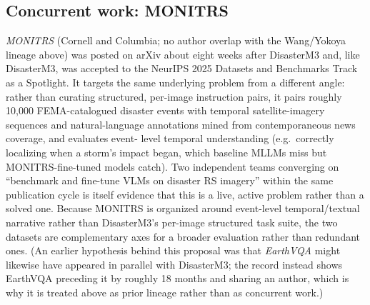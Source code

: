 \subsection{Concurrent work: MONITRS}
\label{sec:related-concurrent}

\emph{MONITRS}  (Cornell and Columbia; no author
overlap with the Wang/Yokoya lineage above) was posted on arXiv about eight
weeks after DisasterM3 and, like DisasterM3, was accepted to the NeurIPS 2025
Datasets and Benchmarks Track as a Spotlight. It targets the same
underlying problem from a different angle: rather than curating structured,
per-image instruction pairs, it pairs roughly 10,000 FEMA-catalogued disaster
events with temporal satellite-imagery sequences and natural-language
annotations mined from contemporaneous news coverage, and evaluates event-
level temporal understanding (e.g.\ correctly localizing when a storm's
impact began, which baseline MLLMs miss but MONITRS-fine-tuned models catch).
Two independent teams converging on ``benchmark and fine-tune VLMs on
disaster RS imagery'' within the same publication cycle is itself evidence
that this is a live, active problem rather than a solved one. Because
MONITRS is organized around event-level temporal/textual narrative rather
than DisasterM3's per-image structured task suite, the two datasets are
complementary axes for a broader evaluation rather than redundant ones. (An
earlier hypothesis behind this proposal was that \emph{EarthVQA} might
likewise have appeared in parallel with DisasterM3; the record instead shows
EarthVQA preceding it by roughly 18 months and sharing an author, which is
why it is treated above as prior lineage rather than as concurrent work.)
